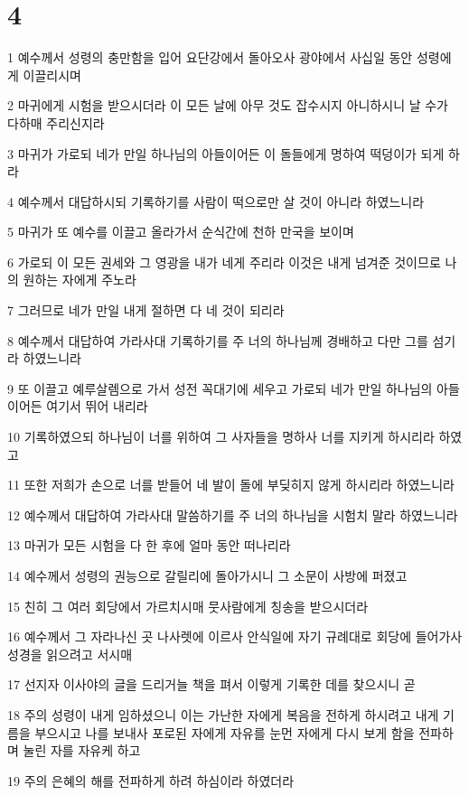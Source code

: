 \chapter{4}

\par 1 예수께서 성령의 충만함을 입어 요단강에서 돌아오사 광야에서 사십일 동안 성령에게 이끌리시며
\par 2 마귀에게 시험을 받으시더라 이 모든 날에 아무 것도 잡수시지 아니하시니 날 수가 다하매 주리신지라
\par 3 마귀가 가로되 네가 만일 하나님의 아들이어든 이 돌들에게 명하여 떡덩이가 되게 하라
\par 4 예수께서 대답하시되 기록하기를 사람이 떡으로만 살 것이 아니라 하였느니라
\par 5 마귀가 또 예수를 이끌고 올라가서 순식간에 천하 만국을 보이며
\par 6 가로되 이 모든 권세와 그 영광을 내가 네게 주리라 이것은 내게 넘겨준 것이므로 나의 원하는 자에게 주노라
\par 7 그러므로 네가 만일 내게 절하면 다 네 것이 되리라
\par 8 예수께서 대답하여 가라사대 기록하기를 주 너의 하나님께 경배하고 다만 그를 섬기라 하였느니라
\par 9 또 이끌고 예루살렘으로 가서 성전 꼭대기에 세우고 가로되 네가 만일 하나님의 아들이어든 여기서 뛰어 내리라
\par 10 기록하였으되 하나님이 너를 위하여 그 사자들을 명하사 너를 지키게 하시리라 하였고
\par 11 또한 저희가 손으로 너를 받들어 네 발이 돌에 부딪히지 않게 하시리라 하였느니라
\par 12 예수께서 대답하여 가라사대 말씀하기를 주 너의 하나님을 시험치 말라 하였느니라
\par 13 마귀가 모든 시험을 다 한 후에 얼마 동안 떠나리라
\par 14 예수께서 성령의 권능으로 갈릴리에 돌아가시니 그 소문이 사방에 퍼졌고
\par 15 친히 그 여러 회당에서 가르치시매 뭇사람에게 칭송을 받으시더라
\par 16 예수께서 그 자라나신 곳 나사렛에 이르사 안식일에 자기 규례대로 회당에 들어가사 성경을 읽으려고 서시매
\par 17 선지자 이사야의 글을 드리거늘 책을 펴서 이렇게 기록한 데를 찾으시니 곧
\par 18 주의 성령이 내게 임하셨으니 이는 가난한 자에게 복음을 전하게 하시려고 내게 기름을 부으시고 나를 보내사 포로된 자에게 자유를 눈먼 자에게 다시 보게 함을 전파하며 눌린 자를 자유케 하고
\par 19 주의 은혜의 해를 전파하게 하려 하심이라 하였더라
